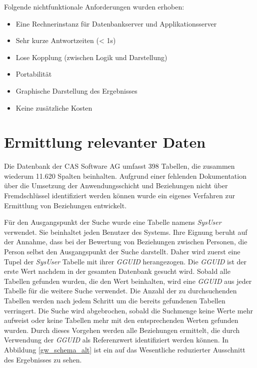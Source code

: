 Folgende nichtfunktionale Anforderungen wurden erhoben:

\begin{itemize}
	
	\item Eine Rechnerinstanz für Datenbankserver und Applikationsserver 
	
	\item Sehr kurze Antwortzeiten (< 1s)
	
	\item Lose Kopplung (zwischen Logik und Darstellung)
	
	\item Portabilität
	
	\item Graphische Darstellung des Ergebnisses
	
	\item Keine zusätzliche Kosten

\end{itemize}

\section{Ermittlung relevanter Daten}
\label{ch:Systemanalyse:sec:Information}

Die Datenbank der CAS Software AG umfasst 398 Tabellen, die zusammen wiederum 11.620 Spalten beinhalten. Aufgrund einer fehlenden Dokumentation über die Umsetzung der Anwendungsschicht und Beziehungen nicht über Fremdschlüssel identifiziert werden können wurde ein eigenes Verfahren zur Ermittlung von Beziehungen entwickelt. 

Für den Ausgangspunkt der Suche wurde eine Tabelle namens \textit{SysUser} verwendet. Sie beinhaltet jeden Benutzer des Systems. Ihre Eignung beruht auf der Annahme, dass bei der Bewertung von Beziehungen zwischen Personen, die Person selbst den Ausgangspunkt der Suche darstellt. Daher wird zuerst eine Tupel der \textit{SysUser} Tabelle mit ihrer \textit{GGUID} herangezogen. Die \textit{GGUID} ist der erste Wert nachdem in der gesamten Datenbank gesucht wird. Sobald alle Tabellen gefunden wurden, die den Wert beinhalten, wird eine \textit{GGUID} aus jeder Tabelle für die weitere Suche verwendet. Die Anzahl der zu durchsuchenden Tabellen werden nach jedem Schritt um die bereits gefundenen Tabellen verringert. Die Suche wird abgebrochen, sobald die Suchmenge keine Werte mehr aufweist oder keine Tabellen mehr mit den entsprechenden Werten gefunden wurden. Durch dieses Vorgehen werden alle Beziehungen ermittelt, die durch Verwendung der \textit{GGUID} als Referenzwert identifiziert werden können. In Abbildung \ref{gw_schema_alt} ist ein auf das Wesentliche reduzierter Ausschnitt des Ergebnisses zu sehen. 

